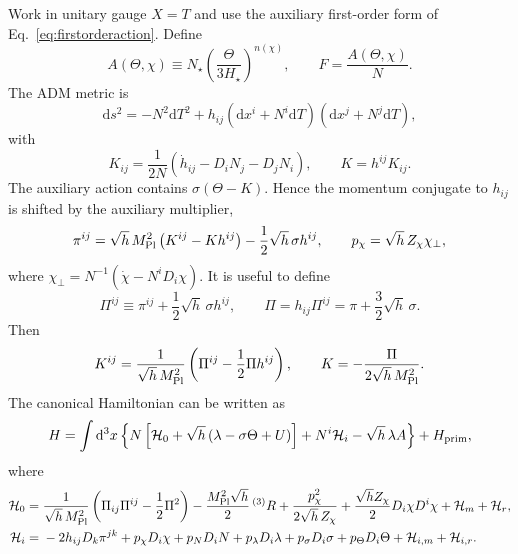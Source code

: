 \documentclass[aps,prd,reprint,nofootinbib,superscriptaddress,longbibliography]{revtex4-2}
\newcommand{\dd}{\mathrm{d}}
\newcommand{\mpl}{M_{\rm Pl}}
\begin{document}
Work in unitary gauge $X=T$ and use the auxiliary first-order form of Eq.~\eqref{eq:firstorderaction}. Define
\begin{equation}
  A(\Theta,\chi)\equiv N_\star\left(\frac{\Theta}{3H_\star}\right)^{n(\chi)},
  \qquad
  F=\frac{A(\Theta,\chi)}{N} .
\end{equation}
The ADM metric is
\begin{equation}
  \dd s^2=-N^2\dd T^2+h_{ij}(\dd x^i+N^i\dd T)(\dd x^j+N^j\dd T),
\end{equation}
with
\begin{equation}
  K_{ij}=\frac{1}{2N}\left(\dot h_{ij}-D_iN_j-D_jN_i\right),\qquad K=h^{ij}K_{ij}.
\end{equation}
The auxiliary action contains $\sigma(\Theta-K)$. Hence the momentum conjugate to $h_{ij}$ is shifted by the auxiliary multiplier,
\begin{equation}
  \pi^{ij}=\sqrt h\,\mpl^2\left(K^{ij}-Kh^{ij}\right)-\frac{1}{2}\sqrt h\,\sigma h^{ij},
  \qquad
  p_\chi=\sqrt h\,Z_\chi\chi_\perp,
  \label{eq:pi_shift_explicit}
\end{equation}
where $\chi_\perp=N^{-1}(\dot\chi-N^iD_i\chi)$. It is useful to define
\begin{equation}
  \Pi^{ij}\equiv \pi^{ij}+\frac{1}{2}\sqrt h\,\sigma h^{ij},
  \qquad
  \Pi=h_{ij}\Pi^{ij}=\pi+\frac{3}{2}\sqrt h\,\sigma .
\end{equation}
Then
\begin{equation}
  K^{ij}=\frac{1}{\sqrt h\,\mpl^2}\left(\Pi^{ij}-\frac{1}{2}\Pi h^{ij}\right),
  \qquad
  K=-\frac{\Pi}{2\sqrt h\,\mpl^2}.
  \label{eq:K_inverted_explicit}
\end{equation}
The canonical Hamiltonian can be written as
\begin{equation}
  H=\int\dd^3x\left\{N\left[\mathcal H_0+\sqrt h\left(\lambda-\sigma\Theta+U\right)\right]+N^i\mathcal H_i-\sqrt h\,\lambda A\right\}+H_{\rm prim},
  \label{eq:H_canonical_explicit}
\end{equation}
where
\begin{align}
  \mathcal H_0={}&\frac{1}{\sqrt h\,\mpl^2}\left(\Pi_{ij}\Pi^{ij}-\frac{1}{2}\Pi^2\right)-\frac{\mpl^2\sqrt h}{2}\,{}^{(3)}R
  +\frac{p_\chi^2}{2\sqrt h\,Z_\chi}+\frac{\sqrt h Z_\chi}{2}D_i\chi D^i\chi+\mathcal H_m+\mathcal H_r,
  \label{eq:H0_explicit}\\
  \mathcal H_i={}&-2h_{ij}D_k\pi^{jk}+p_\chi D_i\chi+p_ND_iN+p_\lambda D_i\lambda+p_\sigma D_i\sigma+p_\Theta D_i\Theta+\mathcal H_{i,m}+\mathcal H_{i,r} .
  \label{eq:Hi_explicit}
\end{align}
\end{document}
